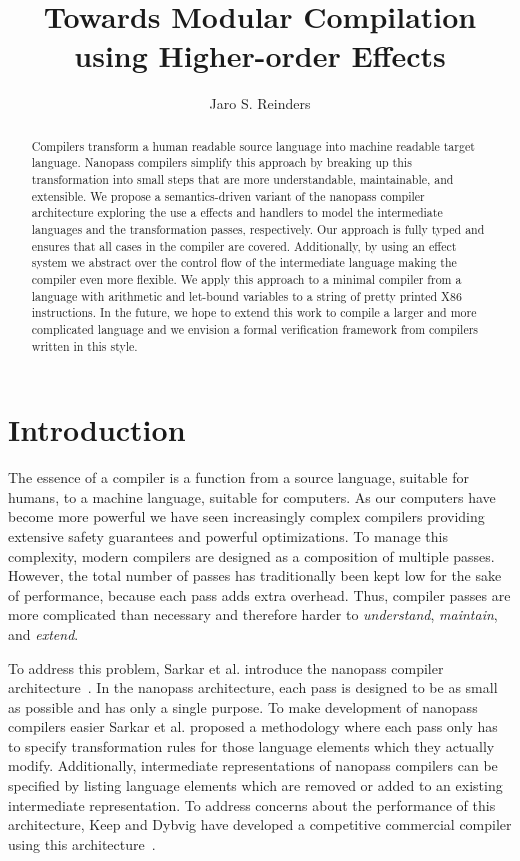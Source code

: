 \documentclass[a4paper,UKenglish,cleveref, autoref, thm-restate, anonymous]{oasics-v2021}
\title{Towards Modular Compilation using Higher-order Effects}
\author{Jaro S. Reinders}{Delft University of Technology, Netherlands}{j.s.reinders@tudelft.nl}{https://orcid.org/0000-0002-6837-3757}{} %
\begin{document}
\maketitle

\begin{abstract}
  Compilers transform a human readable source language into machine readable target language.
  Nanopass compilers simplify this approach by breaking up this transformation into small steps that are more understandable, maintainable, and extensible.
  We propose a semantics-driven variant of the nanopass compiler architecture exploring the use a effects and handlers to model the intermediate languages and the transformation passes, respectively.
  Our approach is fully typed and ensures that all cases in the compiler are covered.
  Additionally, by using an effect system we abstract over the control flow of the intermediate language making the compiler even more flexible.
  We apply this approach to a minimal compiler from a language with arithmetic and let-bound variables to a string of pretty printed X86 instructions.
  In the future, we hope to extend this work to compile a larger and more complicated language and we envision a formal verification framework from compilers written in this style.
\end{abstract}

\section{Introduction}

The essence of a compiler is a function from a source language, suitable for humans, to a machine language, suitable for computers.
As our computers have become more powerful we have seen increasingly complex compilers providing extensive safety guarantees and powerful optimizations.
To manage this complexity, modern compilers are designed as a composition of multiple passes.
However, the total number of passes has traditionally been kept low for the sake of performance, because each pass adds extra overhead.
Thus, compiler passes are more complicated than necessary and therefore harder to \emph{understand}, \emph{maintain}, and \emph{extend}.

To address this problem, Sarkar et al. introduce the nanopass compiler architecture~\cite{10.1145/1016850.1016878}.
In the nanopass architecture, each pass is designed to be as small as possible and has only a single purpose.
To make development of nanopass compilers easier Sarkar et al. proposed a methodology where each pass only has to specify transformation rules for those language elements which they actually modify.
Additionally, intermediate representations of nanopass compilers can be specified by listing language elements which are removed or added to an existing intermediate representation.
To address concerns about the performance of this architecture, Keep and Dybvig have developed a competitive commercial compiler using this architecture~\cite{10.1145/2544174.2500618}.
\end{document}
